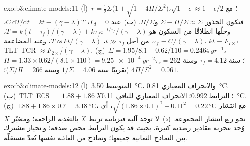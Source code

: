 \begin{solution}{exo:b3:climate-models:11}
(أ)~$r = \tfrac12\Sigma\big(1 \pm \sqrt{1 - 4\Pi/\Sigma^2}\big)$؛ مع
$\sqrt{1 - \epsilon} \approx 1 - \epsilon/2$، فتكون الجذور $\Sigma -
\Pi/\Sigma \approx \Sigma$ و$\Pi/\Sigma$. (ب)~عند $T_d = 0$، $C\,\mathrm
dT/\mathrm dt = kt - (\gamma - \lambda)T$، وحلّها انطلاقًا من السكون هو $T =
k(t - \tau_f)/(\gamma - \lambda) + k\tau_f\mathrm e^{-t/\tau_f}/(\gamma -
\lambda)$، $\tau_f = C/(\gamma - \lambda)$. من أجل $t \gg \tau_f$، $T \approx
kt/(\gamma - \lambda)$، وعند المضاعفة، $kt = F_{2\times}$: \mbox{\textdir TLT TCR}
$\approx F_{2\times}/(\gamma - \lambda)$. (ج)~$\Sigma = 1.95/8.1 +
0.62/110 = \qty{0.2464}{yr^{-1}}$، $\Pi = 1.33\times0.62/(8.1\times110) =
\qty{9.25e-4}{yr^{-2}}$؛ $\tau_f = \num{4.12}\text{ سنة}$ و$\tau_s =
\num{262}\text{ سنة}$ (تقريبًا $1/\Sigma = \num{4.06}\text{ سنة}$
و$\Sigma/\Pi = \num{266}\text{ سنة}$)؛ $4\Pi/\Sigma^2 = 0.061$.
\end{solution}

\begin{solution}{exo:b3:climate-models:12}
(أ)~المتوسط \qty{3.50}{\celsius}، والانحراف المعياري \qty{0.81}{\celsius}.
(ب)~\mbox{\textdir TLT ECS $= 1.88 + 1.86\,X$}؛ الترابط \num{0.992}؛ الانحراف المعياري
للباقي \qty{0.11}{\celsius}. (ج)~$1.88 + 1.86\times0.7 =
\qty{3.18}{\celsius}$، مع انتشار $\sqrt{(1.86\times0.1)^2 + 0.11^2} =
\qty{0.22}{\celsius}$، أي نحو ربع انتشار المجموعة.
(د)~لا توجد آلية فيزيائية تربط $X$ بالتغذية الراجعة؛ ومتغيّر $X$ وُجد
بتجربة مقادير رصدية كثيرة، بحيث قد يكون الترابط محض صدفة؛ وانحياز
مشترك بين النماذج الثمانية جميعها؛ ونماذج من العائلة نفسها تُعدّ
مستقلّة.
\end{solution}

